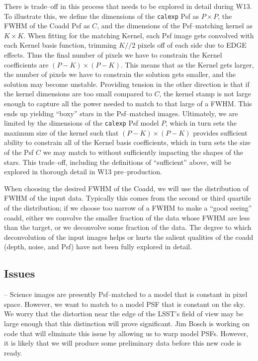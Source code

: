 \documentclass[12pt]{article}
\begin{document}
There is trade--off in this process that needs to be explored in
detail during W13.  To illustrate this, we define the dimensions of
the {\tt calexp} Psf as $P \times P$, the FWHM of the Coadd Psf as
$C$, and the dimensions of the Psf--matching kernel as $K \times K$.
When fitting for the matching Kernel, each Psf image gets convolved
with each Kernel basis function, trimming $K//2$ pixels off of each
side due to EDGE effects.  Thus the final number of pixels we have to
constrain the Kernel coefficients are $(P-K) \times (P-K)$.  This
means that as the Kernel gets larger, the number of pixels we have to
constrain the solution gets smaller, and the solution may become
unstable.  Providing tension in the other direction is that if the
kernel dimensions are too small compared to $C$, the kernel stamp is
not large enough to capture all the power needed to match to that
large of a FWHM.  This ends up yielding ``boxy'' stars in the
Psf--matched images.  Ultimately, we are limited by the dimensions of
the {\tt calexp} Psf model $P$, which in turn sets the maximum size of
the kernel such that $(P-K) \times (P-K)$ provides sufficient ability
to constrain all of the Kernel basis coefficients, which in turn sets
the size of the Psf $C$ we may match to without sufficiently impacting
the shapes of the stars.  This trade--off, including the definitions
of ``sufficient'' above, will be explored in thorough detail in W13
pre--production.

When choosing the desired FWHM of the Coadd, we will use the
distribution of FWHM of the input data.  Typically this comes from the
second or third quartile of the distribution; if we choose too narrow
of a FWHM to make a ``good seeing'' coadd, either we convolve the
smaller fraction of the data whose FWHM are less than the target, or
we deconvolve some fraction of the data.  The degree to which
deconvolution of the input images helps or hurts the salient qualities
of the coadd (depth, noise, and Psf) have not been fully explored in
detail.

\subsection{Issues}

-- Science images are presently Psf--matched to a model that is constant in pixel space.
However, we want to match to a model PSF that is constant on the sky. We worry that the
distortion near the edge of the LSST's field of view may be large enough
that this distinction will prove significant. Jim Bosch is working on code
that will eliminate this issue by allowing us to warp model PSFs.
However, it is likely that we will produce some preliminary data before this new code is ready.
\end{document}

